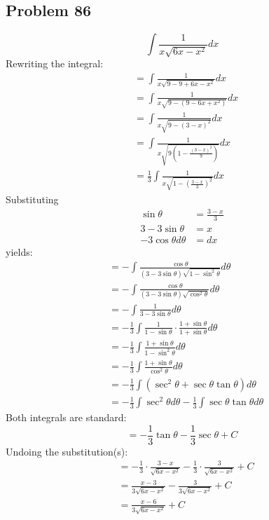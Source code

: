 \documentclass{article}
\begin{document}
\subsection*{Problem 86}
$$\int\frac{1}{x\sqrt{6x-x^2}}dx$$
Rewriting the integral:
\begin{align*}
&=\int\frac{1}{x\sqrt{9-9+6x-x^2}}dx \\
&=\int\frac{1}{x\sqrt{9-(9-6x+x^2)}}dx \\
&=\int\frac{1}{x\sqrt{9-(3-x)^2}}dx \\
&=\int\frac{1}{x\sqrt{9\left(1-\frac{(3-x)^2}{9}\right)}}dx \\
&=\frac{1}{3}\int\frac{1}{x\sqrt{1-\left(\frac{3-x}{3}\right)^2}}dx
\end{align*}
Substituting
\begin{align*}
\sin\theta&=\frac{3-x}{3} \\
3-3\sin\theta&=x \\
-3\cos\theta d\theta&=dx
\end{align*}
yields:
\begin{align*}
&=-\int\frac{\cos\theta}{(3-3\sin\theta)\sqrt{1-\sin^2\theta}}d\theta \\
&=-\int\frac{\cos\theta}{(3-3\sin\theta)\sqrt{\cos^2\theta}}d\theta \\
&=-\int\frac{1}{3-3\sin\theta}d\theta \\
&=-\frac{1}{3}\int\frac{1}{1-\sin\theta}\cdot\frac{1+\sin\theta}{1+\sin\theta}d\theta \\
&=-\frac{1}{3}\int\frac{1+\sin\theta}{1-\sin^2\theta}d\theta \\
&=-\frac{1}{3}\int\frac{1+\sin\theta}{\cos^2\theta}d\theta \\
&=-\frac{1}{3}\int\left(\sec^2\theta+\sec\theta\tan\theta\right)d\theta \\
&=-\frac{1}{3}\int\sec^2\theta d\theta-\frac{1}{3}\int\sec\theta\tan\theta d\theta
\end{align*}
Both integrals are standard:
$$=-\frac{1}{3}\tan\theta-\frac{1}{3}\sec\theta+C$$
Undoing the substitution(s):
\begin{align*}
&=-\frac{1}{3}\cdot\frac{3-x}{\sqrt{6x-x^2}}-\frac{1}{3}\cdot\frac{3}{\sqrt{6x-x^2}}+C \\
&=\frac{x-3}{3\sqrt{6x-x^2}}-\frac{3}{3\sqrt{6x-x^2}}+C \\
&=\frac{x-6}{3\sqrt{6x-x^2}}+C
\end{align*}
\end{document}
